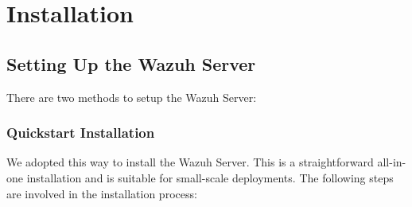 \section{Installation}
\subsection{Setting Up the Wazuh Server}

There are two methods to setup the Wazuh Server:

\subsubsection{Quickstart Installation}
We adopted this way to install the Wazuh Server. This is a straightforward all-in-one installation and is suitable for small-scale deployments. The following steps are involved in the installation process:
